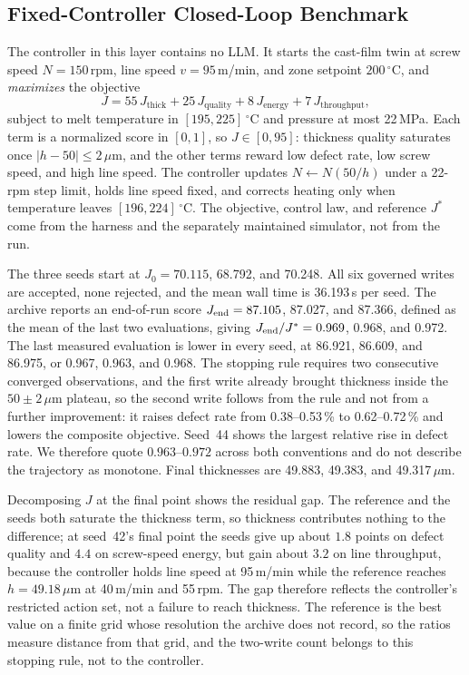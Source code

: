 \subsection{Fixed-Controller Closed-Loop Benchmark}
\label{sec:clbench}
The controller in this layer contains no LLM. It starts the cast-film twin at screw
speed $N=150$\,rpm, line speed $v=95$\,m/min, and zone setpoint $200\,^\circ$C, and
\emph{maximizes} the objective
\begin{equation}
J = 55\,J_\text{thick} + 25\,J_\text{quality} +
8\,J_\text{energy} + 7\,J_\text{throughput},
\label{eq:objective}
\end{equation}
subject to melt temperature in $[195,225]\,^\circ$C and pressure at most 22\,MPa.
Each term is a normalized score in $[0,1]$, so $J\in[0,95]$: thickness quality
saturates once $|h-50|\leq2\,\mu$m, and the other terms reward low defect rate, low
screw speed, and high line speed. The controller updates $N\leftarrow N(50/h)$ under
a 22-rpm step limit, holds line speed fixed, and corrects heating only when
temperature leaves $[196,224]\,^\circ$C. The objective, control law, and reference
$J^{*}$ come from the harness and the separately maintained simulator, not from the
run.

The three seeds start at $J_0=70.115$, 68.792, and 70.248. All six governed writes
are accepted, none rejected, and the mean wall time is 36.193\,s per seed. The
archive reports an end-of-run score $J_{\rm end}=87.105$, 87.027, and 87.366,
defined as the mean of the last two evaluations, giving
$J_{\rm end}/J^{*}=0.969$, 0.968, and 0.972. The last measured evaluation is lower
in every seed, at 86.921, 86.609, and 86.975, or 0.967, 0.963, and 0.968. The
stopping rule requires two consecutive converged observations, and the first write
already brought thickness inside the $50\pm2\,\mu$m plateau, so the second write
follows from the rule and not from a further improvement: it raises defect rate from 0.38--0.53\,\% to 0.62--0.72\,\% and lowers the composite objective. Seed~44 shows the largest relative rise in defect rate. We therefore
quote $0.963$--$0.972$ across both conventions and do not describe the trajectory as
monotone. Final thicknesses are 49.883, 49.383, and 49.317\,$\mu$m.

Decomposing $J$ at the final point shows the residual gap. The reference and the
seeds both saturate the thickness term, so thickness contributes nothing to the
difference; at seed~42's final point the seeds give up about $1.8$ points on defect quality and $4.4$ on screw-speed energy, but gain about $3.2$ on line throughput, because the controller
holds line speed at 95\,m/min while the reference reaches $h=49.18\,\mu$m at
40\,m/min and 55\,rpm. The gap therefore reflects the controller's restricted action set, not a failure to reach thickness. The reference is the best value on a finite grid
whose resolution the archive does not record, so the ratios measure distance from
that grid, and the two-write count belongs to this stopping rule, not to the
controller.


